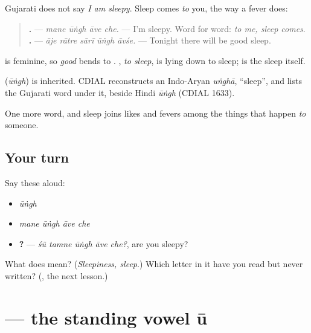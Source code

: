 Gujarati does not say \emph{I am sleepy}. Sleep comes \emph{to} you, the way a fever does:

\begin{quote}
\textbf{   .} — \emph{mane ūṅgh āve che.} — I'm sleepy. Word for word: \emph{to me, sleep comes}. \textbf{    .} — \emph{āje rātre sārī ūṅgh āvśe.} — Tonight there will be good sleep.
\end{quote}

\textbf{} is feminine, so \emph{good} bends to \textbf{}. \textbf{}, \emph{to sleep}, is lying down to sleep; \textbf{} is the sleep itself.

\begin{cousinweb}
\textbf{} (\emph{ūṅgh}) is inherited. CDIAL reconstructs an Indo-Aryan \emph{uṅghā}, \textquotedblleft{}sleep\textquotedblright{}, and lists the Gujarati word under it, beside Hindi \emph{ūṅgh} (CDIAL 1633).
\end{cousinweb}

\begin{grammarlens}[title={What you've built}]
One more word, and sleep joins likes and fevers among the things that happen \emph{to} someone.
\end{grammarlens}

\subsection*{Your turn}
Say these aloud:

\begin{itemize}
\raggedright
  \item \emph{ūṅgh}
  \item \emph{mane ūṅgh āve che}
  \item \textbf{    ?} — \emph{śũ tamne ūṅgh āve che?}, are you sleepy?
\end{itemize}

\begin{tcolorbox}[breakable,colback=teal!4,colframe=teal!35!black,title={Before you move on}]
What does \textbf{} mean? (\emph{Sleepiness, sleep}.) Which letter in it have you read but never written? (\textbf{}, the next lesson.)
\end{tcolorbox}
\section[\texorpdfstring{\gu{ઊ} (ū)}{ઊ (ū)}]{ — the standing vowel ū}

